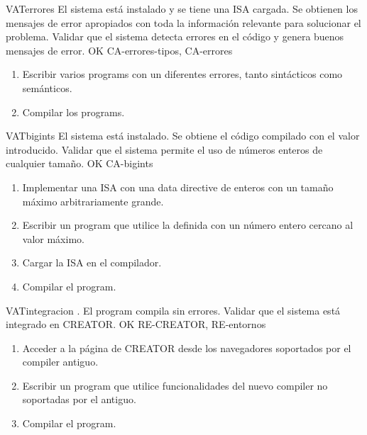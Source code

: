 \begin{testCase}{VAT}{errores}
    {El sistema está instalado y se tiene una \gls{ISA} cargada.} %
    {Se obtienen los mensajes de error apropiados con toda la información
    relevante para solucionar el problema.} %
    {Validar que el sistema detecta errores en el código 
    y genera buenos mensajes de error.} %
    {OK} %
    {CA-errores-tipos, CA-errores} %
    \begin{enumerate}[leftmargin=*, topsep=0pt, noitemsep] %
        \item Escribir varios \glspl{program} con un diferentes errores, tanto
        sintácticos como semánticos.
        \item Compilar los \glspl{program}.
    \end{enumerate}
\end{testCase}

\begin{testCase}{VAT}{bigints}
    {El sistema está instalado.} %
    {Se obtiene el código compilado con el valor introducido.} %
    {Validar que el sistema permite el uso de números enteros de cualquier tamaño.} %
    {OK} %
    {CA-bigints} %
    \begin{enumerate}[leftmargin=*, topsep=0pt, noitemsep] %
        \item Implementar una \gls{ISA} con una \gls{data directive} de
        enteros con un tamaño máximo arbitrariamente grande.
        \item Escribir un \gls{program} que utilice la  definida con un número entero cercano al valor
        máximo.
        \item Cargar la \gls{ISA} en el compilador.
        \item Compilar el \gls{program}.
    \end{enumerate}
\end{testCase}

\begin{testCase}{VAT}{integracion}
    {\NA.} %
    {El \gls{program} compila sin errores.} %
    {Validar que el sistema está integrado en CREATOR.} %
    {OK} %
    {RE-CREATOR, RE-entornos} %
    \begin{enumerate}[leftmargin=*, topsep=0pt, noitemsep] %
        \item Acceder a la página de CREATOR desde los navegadores soportados
        por el \gls{compiler} antiguo.
        \item Escribir un \gls{program} que utilice funcionalidades del nuevo
        \gls{compiler} no soportadas por el antiguo.
        \item Compilar el \gls{program}.
    \end{enumerate}
\end{testCase}

